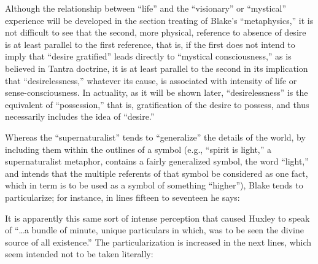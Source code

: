 \label{self:23}


Although the relationship between \enquote{life} and the \enquote{visionary} or \enquote{mystical} experience will be developed in the
section treating of Blake's \enquote{metaphysics,} it is not difficult to see that the second, more physical, reference
to absence of desire is at least parallel to the first reference, that is, if the first does not intend to imply
that \enquote{desire gratified} leads directly to \enquote{mystical consciousness,} as is believed in Tantra doctrine, it
is at least parallel to the second in its implication that \enquote{desirelessness,} whatever its cause,
is associated with intensity of life or sense-consciousness. In actuality, as it will be shown later, \enquote{desirelessness}
is the equivalent of \enquote{possession,} that is, gratification of the desire to possess, and thus necessarily includes the
idea of \enquote{desire.}

Whereas the \enquote{supernaturalist} tends to \enquote{generalize} the details of the world, by
including them within the outlines of a symbol (e.g., \enquote{spirit is light,} a supernaturalist metaphor,
contains a fairly generalized symbol, the word \enquote{light,} and intends that the multiple
referents of that symbol be considered as one fact, which in term is to be used as a
symbol of something \enquote{higher}), Blake tends to particularize; for instance, in lines fifteen to seventeen he says:


It is apparently this same sort of intense perception that caused Huxley to speak of
\enquote{\dots a bundle of minute, unique particulars in which, was to be seen the divine source
of all existence.}\supercite{huxley:doors-of-perception}
The particularization is increased in the next lines,
which seem intended not to be taken literally:


